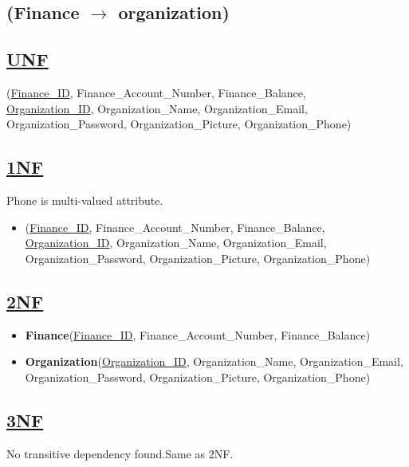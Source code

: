 \subsection{\texorpdfstring{\centering (Finance $\rightarrow$ organization)}{(Finance-organization)}}

\subsection*{\underline{UNF}}

(\underline{Finance\_ID}, Finance\_Account\_Number, Finance\_Balance,\\
\underline{Organization\_ID}, Organization\_Name, Organization\_Email, Organization\_Password, Organization\_Picture, Organization\_Phone)

\subsection*{\underline{1NF}}
Phone is multi-valued attribute.
\vskip 0.2in

\begin{itemize}
    \item
          (\underline{Finance\_ID}, Finance\_Account\_Number, Finance\_Balance,\\
          \underline{Organization\_ID}, Organization\_Name, Organization\_Email, Organization\_Password, Organization\_Picture, Organization\_Phone)
\end{itemize}

\subsection*{\underline{2NF}}
\begin{itemize}
    \item \textbf{Finance}(\underline{Finance\_ID}, Finance\_Account\_Number, Finance\_Balance)
    \item \textbf{Organization}(\underline{Organization\_ID}, Organization\_Name, Organization\_Email, Organization\_Password, Organization\_Picture, Organization\_Phone)
\end{itemize}

\subsection*{\underline{3NF}}
No transitive dependency found.Same as 2NF.

